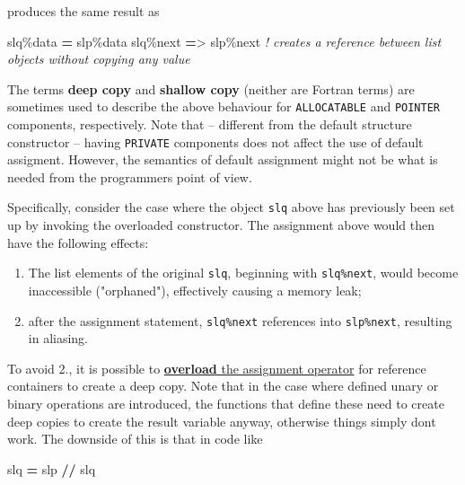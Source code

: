 \documentclass[]{scrartcl}
\newenvironment{Shaded}{}{}
\newcommand{\CommentTok}[1]{\textcolor[rgb]{0.38,0.63,0.69}{\textit{#1}}}
\newcommand{\KeywordTok}[1]{\textcolor[rgb]{0.00,0.44,0.13}{\textbf{#1}}}
\newcommand{\NormalTok}[1]{#1}
\newcommand{\OperatorTok}[1]{\textcolor[rgb]{0.40,0.40,0.40}{#1}}
\providecommand{\tightlist}{%
  \setlength{\itemsep}{0pt}\setlength{\parskip}{0pt}}
\begin{document}
produces the same result as

\begin{Shaded}
\begin{Highlighting}[]
\NormalTok{slq}\OperatorTok{\%}\NormalTok{data }\KeywordTok{=}\NormalTok{ slp}\OperatorTok{\%}\NormalTok{data}
\NormalTok{slq}\OperatorTok{\%}\NormalTok{next }\KeywordTok{=}\OperatorTok{\textgreater{}}\NormalTok{ slp}\OperatorTok{\%}\NormalTok{next  }\CommentTok{! creates a reference between list objects without copying any value}
\end{Highlighting}
\end{Shaded}

The terms \textbf{deep copy} and \textbf{shallow copy} (neither are
Fortran terms) are sometimes used to describe the above behaviour for
\texttt{ALLOCATABLE} and \texttt{POINTER} components, respectively. Note
that -- different from the default structure constructor -- having
\texttt{PRIVATE} components does not affect the use of default
assigment. However, the semantics of default assignment might not be
what is needed from the programmer\textquotesingle s point of view.

Specifically, consider the case where the object \texttt{slq} above has
previously been set up by invoking the overloaded constructor. The
assignment above would then have the following effects:

\begin{enumerate}
\def\labelenumi{\arabic{enumi}.}
\tightlist
\item
  The list elements of the original \texttt{slq}, beginning with
  \texttt{slq\%next}, would become inaccessible ("orphaned"),
  effectively causing a memory leak;
\item
  after the assignment statement, \texttt{slq\%next} references into
  \texttt{slp\%next}, resulting in aliasing.
\end{enumerate}

To avoid 2., it is possible to
\href{https://en.wikipedia.org/wiki/Fortran_95_language_features\#Derived-data_types}{\textbf{overload}
the assignment operator} for reference containers to create a deep copy.
Note that in the case where defined unary or binary operations are
introduced, the functions that define these need to create deep copies
to create the result variable anyway, otherwise things simply
don\textquotesingle t work. The downside of this is that in code like

\begin{Shaded}
\begin{Highlighting}[]
\NormalTok{slq }\KeywordTok{=}\NormalTok{ slp }\KeywordTok{//}\NormalTok{ slq}
\end{Highlighting}
\end{Shaded}
\end{document}
